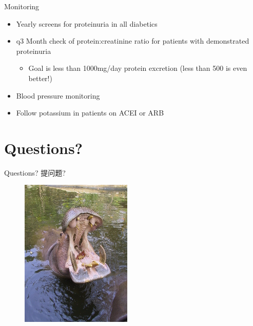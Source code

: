 \begin{frame}{Monitoring}

\begin{itemize}
\itemsep1pt\parskip0pt
\item
  Yearly screens for proteinuria in all diabetics
\item
  q3 Month check of protein:creatinine ratio for patients with
  demonstrated proteinuria

  \begin{itemize}
  \itemsep1pt\parskip0pt
  \item
    Goal is less than 1000mg/day protein excretion (less than 500 is
    even better!)
  \end{itemize}
\item
  Blood pressure monitoring
\item
  Follow potassium in patients on ACEI or ARB
\end{itemize}

\end{frame}

\section{Questions?}\label{questions}

\begin{frame}{Questions? 提问题?}

\begin{figure}[htbp]
\centering
\includegraphics{./img/img_0510_200.jpg}
\caption{}
\end{figure}

\end{frame}

